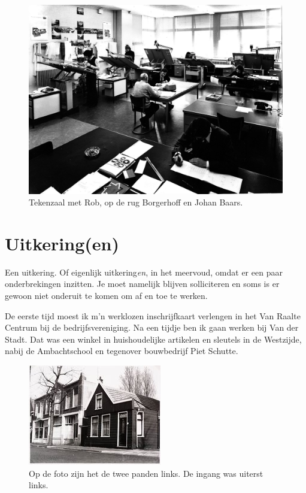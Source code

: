 \documentclass[12pt,twoside, openright]{memoir}
\begin{document}
\begin{figure}
\centering
\includegraphics[width=\textwidth]{img/244kantoor.png}
\caption*{\footnotesize Tekenzaal met Rob, op de rug Borgerhoff en Johan Baars.}
\end{figure}

\section*{Uitkering(en)} %
\label{cha:uitkering_en}

Een uitkering. Of eigenlijk uitkering\emph{en}, in het meervoud, omdat er een paar onderbrekingen inzitten. Je moet namelijk blijven solliciteren en soms is er gewoon niet onderuit te komen om af en toe te werken. 

De eerste tijd moest ik m'n werklozen inschrijfkaart verlengen in het Van Raalte Centrum bij de bedrijfsvereniging. Na een tijdje ben ik gaan werken bij Van der Stadt. Dat was een winkel in huishoudelijke artikelen en sleutels in de Westzijde, nabij de Ambachtschool en tegenover bouwbedrijf Piet Schutte.

\begin{figure}
\centering
\includegraphics[width=\textwidth]{img/ch41/stadt}
\caption*{\footnotesize Op de foto zijn het de twee panden links. De ingang was uiterst links.}
\end{figure}
\end{document}
